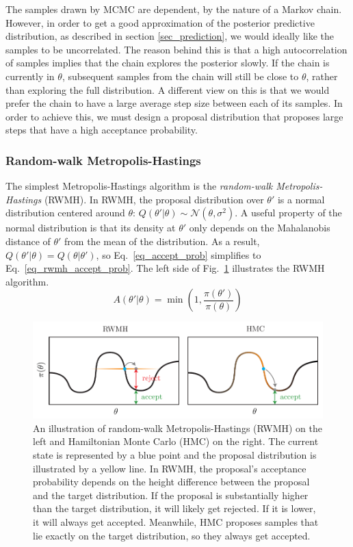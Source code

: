 \documentclass[12pt]{article}
\begin{document}
The samples drawn by MCMC are dependent, by the nature of a Markov chain. However, in order to get a good approximation of the posterior predictive distribution, as described in section \ref{sec_prediction}, we would ideally like the samples to be uncorrelated. The reason behind this is that a high autocorrelation of samples implies that the chain explores the posterior slowly. If the chain is currently in $\theta$, subsequent samples from the chain will still be close to $\theta$, rather than exploring the full distribution. A different view on this is that we would prefer the chain to have a large average step size between each of its samples. In order to achieve this, we must design a proposal distribution that proposes large steps that have a high acceptance probability.

\subsubsection{Random-walk Metropolis-Hastings}

The simplest Metropolis-Hastings algorithm is the \textit{random-walk Metropolis-Hastings} (RWMH). In RWMH, the proposal distribution over $\theta'$ is a normal distribution centered around $\theta$: $Q(\theta'|\theta) \sim \mathcal{N}(\theta, \sigma^2)$. A useful property of the normal distribution is that its density at $\theta'$ only depends on the Mahalanobis distance of $\theta'$ from the mean of the distribution. As a result, $Q(\theta'|\theta) = Q(\theta|\theta')$, so Eq.\ \ref{eq_accept_prob} simplifies to Eq.\ \ref{eq_rwmh_accept_prob}. The left side of Fig.\ \ref{fig_rwmh_vs_hmc} illustrates the RWMH algorithm.
\begin{equation}
A(\theta'|\theta) = \min \left(1, \frac{\pi(\theta')}{\pi(\theta)} \right)
\label{eq_rwmh_accept_prob}
\end{equation}

\begin{figure}[H]
\centering
\includegraphics[width=14cm]{illustrations/rwmh_vs_hmc.pdf}
\caption{An illustration of random-walk Metropolis-Hastings (RWMH) on the left and Hamiltonian Monte Carlo (HMC) on the right. The current state is represented by a blue point and the proposal distribution is illustrated by a yellow line. In RWMH, the proposal's acceptance probability depends on the height difference between the proposal and the target distribution. If the proposal is substantially higher than the target distribution, it will likely get rejected. If it is lower, it will always get accepted. Meanwhile, HMC proposes samples that lie exactly on the target distribution, so they always get accepted.}
\label{fig_rwmh_vs_hmc}
\end{figure}
\end{document}
